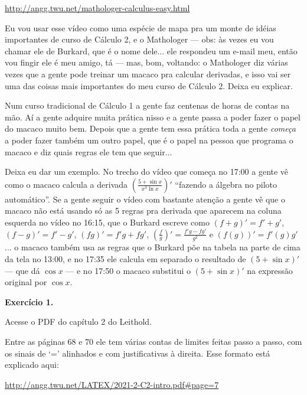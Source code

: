 \documentclass[oneside,12pt]{article}
\begin{document}
\ssk

\url{http://angg.twu.net/mathologer-calculus-easy.html}

\ssk

Eu vou usar esse vídeo como uma espécie de mapa pra um monte de idéias
importantes de curso de Cálculo 2, e o Mathologer --- obs: às vezes eu
vou chamar ele de Burkard, que é o nome dele... ele respondeu um
e-mail meu, então vou fingir ele é meu amigo, tá {\smile} --- mas,
bom, voltando: o Mathologer diz várias vezes que a gente pode treinar
um macaco pra calcular derivadas, e isso vai ser uma das coisas mais
importantes do meu curso de Cálculo 2. Deixa eu explicar.

Num curso tradicional de Cálculo 1 a gente faz centenas de horas de
contas na mão. Aí a gente adquire muita prática nisso e a gente passa
a poder fazer o papel do macaco muito bem. Depois que a gente tem essa
prática toda a gente {\sl começa} a poder fazer também um outro papel,
que é o papel na pessoa que programa o macaco e diz quais regras ele
tem que seguir...

Deixa eu dar um exemplo. No trecho do vídeo que começa no 17:00 a
gente vê como o macaco calcula a derivada
$\left(\frac{5+\sin x}{x^3 \ln x}\right)'$ ``fazendo a álgebra no
piloto automático''. Se a gente seguir o vídeo com bastante atenção a
gente vê que o macaco não está usando só as 5 regras pra derivada que
aparecem na coluna esquerda no vídeo no 16:15, que o Burkard escreve
como $(f+g)' = f'+g'$, $(f-g)' = f'-g'$, $(fg)' = f'g + fg'$,
$(\frac{f}{g})' = \frac{f'g-fg'}{g^2}$ e $(f(g))' = f'(g)g'$... o
macaco também usa as regras que o Burkard põe na tabela na parte de
cima da tela no 13:00, e no 17:35 ele calcula em separado o resultado
de $(5 + \sin x)'$ --- que dá $\cos x$ --- e no 17:50 o macaco
substitui o $(5 + \sin x)'$ na expressão original por $\cos x$.


\newpage

{\bf Exercício 1.}

Acesse o PDF do capítulo 2 do Leithold.

Entre as páginas 68 e 70 ele tem várias contas de limites feitas passo
a passo, com os sinais de `=' alinhados e com justificativas à
direita. Esse formato está explicado aqui:

\ssk

{\footnotesize

\url{http://angg.twu.net/LATEX/2021-2-C2-intro.pdf#page=7}

}
\end{document}
